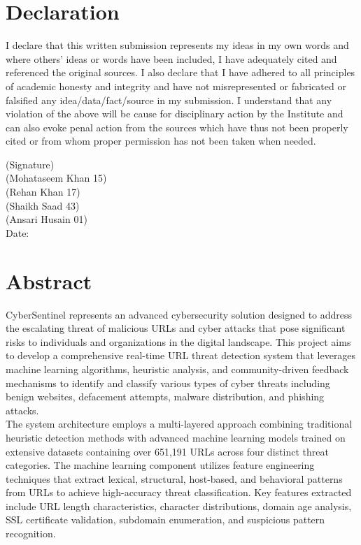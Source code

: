 \documentclass[12pt,a4paper,openany]{report}
\begin{document}
	
	\chapter*{Declaration}
	I declare that this written submission represents my ideas in my own words and where others' ideas or words have been included, I have adequately cited and referenced the original sources. I also declare that I have adhered to all principles of academic honesty and integrity and have not misrepresented or fabricated or falsified any idea/data/fact/source in my submission. I understand that any violation of the above will be cause for disciplinary action by the Institute and can also evoke penal action from the sources which have thus not been properly cited or from whom proper permission has not been taken when needed.
	
	\vspace{1cm}
	\begin{flushright}
		(Signature) \\[0.5cm]
		(Mohataseem Khan 15) \\
		(Rehan Khan 17) \\
		(Shaikh Saad 43) \\
		(Ansari Husain 01) \\
		Date:
	\end{flushright}
	
	\chapter*{Abstract}
	CyberSentinel represents an advanced cybersecurity solution designed to address the escalating threat of malicious URLs and cyber attacks that pose significant risks to individuals and organizations in the digital landscape. This project aims to develop a comprehensive real-time URL threat detection system that leverages machine learning algorithms, heuristic analysis, and community-driven feedback mechanisms to identify and classify various types of cyber threats including benign websites, defacement attempts, malware distribution, and phishing attacks. \\
	
	The system architecture employs a multi-layered approach combining traditional heuristic detection methods with advanced machine learning models trained on extensive datasets containing over 651,191 URLs across four distinct threat categories. The machine learning component utilizes feature engineering techniques that extract lexical, structural, host-based, and behavioral patterns from URLs to achieve high-accuracy threat classification. Key features extracted include URL length characteristics, character distributions, domain age analysis, SSL certificate validation, subdomain enumeration, and suspicious pattern recognition.\\
	
\end{document}
